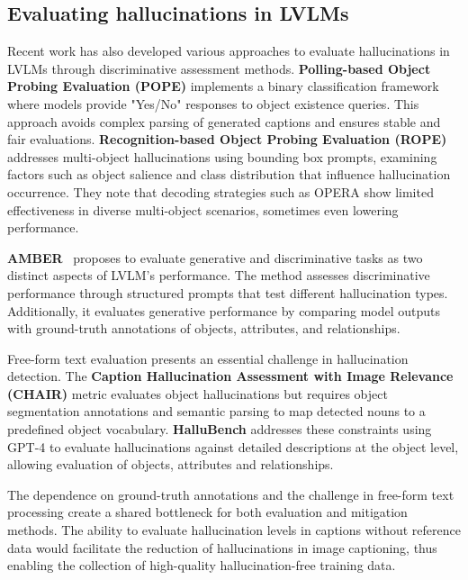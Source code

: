 \subsection{Evaluating hallucinations in LVLMs}\label{subsec-evaluating}
Recent work has also developed various approaches to evaluate hallucinations in LVLMs through discriminative assessment methods. \textbf{Polling-based Object Probing Evaluation (POPE)}\cite{li2023evaluating} implements a binary classification framework where models provide "Yes/No" responses to object existence queries. This approach avoids complex parsing of generated captions and ensures stable and fair evaluations. \textbf{Recognition-based Object Probing Evaluation (ROPE)}\cite{chen2024multi} addresses multi-object hallucinations using bounding box prompts, examining factors such as object salience and class distribution that influence hallucination occurrence. They note that decoding strategies such as OPERA show limited effectiveness in diverse multi-object scenarios, sometimes even lowering performance.

\textbf{AMBER}~\cite{wang2023llm} proposes to evaluate generative and discriminative tasks as two distinct aspects of LVLM's performance. The method assesses discriminative performance through structured prompts that test different hallucination types. Additionally, it evaluates generative performance by comparing model outputs with ground-truth annotations of objects, attributes, and relationships.

Free-form text evaluation presents an essential challenge in hallucination detection. The \textbf{Caption Hallucination Assessment with Image Relevance (CHAIR)}\cite{rohrbach2018object} metric evaluates object hallucinations but requires object segmentation annotations and semantic parsing to map detected nouns to a predefined object vocabulary. \textbf{HalluBench}\cite{zhao2023beyond} addresses these constraints using GPT-4 to evaluate hallucinations against detailed descriptions at the object level, allowing evaluation of objects, attributes and relationships.

The dependence on ground-truth annotations and the challenge in free-form text processing create a shared bottleneck for both evaluation and mitigation methods. The ability to evaluate hallucination levels in captions without reference data would facilitate the reduction of hallucinations in image captioning, thus enabling the collection of high-quality hallucination-free training data.
